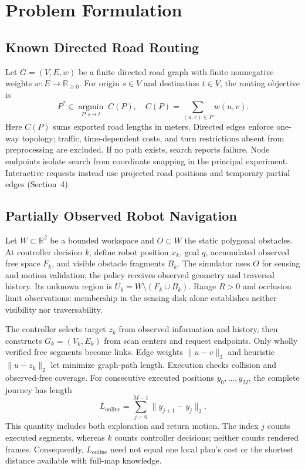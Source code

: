\section{Problem Formulation}
\subsection{Known Directed Road Routing}
Let $G=(V,E,w)$ be a finite directed road graph with finite nonnegative weights $w:E\to\mathbb{R}_{\geq0}$. For origin $s\in V$ and destination $t\in V$, the routing objective is
\begin{equation}
P^*\in\underset{P:s\leadsto t}{\operatorname{argmin}}\;
C(P),\quad C(P)=\sum_{(u,v)\in P}w(u,v).
\end{equation}
Here $C(P)$ sums exported road lengths in meters. Directed edges enforce one-way topology; traffic, time-dependent costs, and turn restrictions absent from preprocessing are excluded. If no path exists, search reports failure. Node endpoints isolate search from coordinate snapping in the principal experiment. Interactive requests instead use projected road positions and temporary partial edges (Section~4).

\subsection{Partially Observed Robot Navigation}
Let $W\subset\mathbb{R}^2$ be a bounded workspace and $O\subset W$ the static polygonal obstacles. At controller decision $k$, define robot position $x_k$, goal $q$, accumulated observed free space $F_k$, and visible obstacle fragments $B_k$. The simulator uses $O$ for sensing and motion validation; the policy receives observed geometry and traversal history. Its unknown region is $U_k=W\setminus(F_k\cup B_k)$. Range $R>0$ and occlusion limit observations: membership in the sensing disk alone establishes neither visibility nor traversability.

The controller selects target $z_k$ from observed information and history, then constructs $G_k=(V_k,E_k)$ from scan centers and request endpoints. Only wholly verified free segments become links. Edge weights $\|u-v\|_2$ and heuristic $\|u-z_k\|_2$ let \astar{} minimize graph-path length. Execution checks collision and observed-free coverage. For consecutive executed positions $y_0,\ldots,y_M$, the complete journey has length
\begin{equation}
L_{\mathrm{online}}=\sum_{j=0}^{M-1}\|y_{j+1}-y_j\|_2.
\end{equation}
This quantity includes both exploration and return motion. The index $j$ counts executed segments, whereas $k$ counts controller decisions; neither counts rendered frames. Consequently, $L_{\mathrm{online}}$ need not equal one local plan's cost or the shortest distance available with full-map knowledge.

